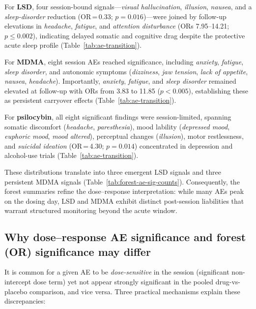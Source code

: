 For \textbf{LSD}, four session-bound signals---\textit{visual hallucination}, \textit{illusion}, \textit{nausea}, and a \textit{sleep-disorder} reduction (OR\,=\,0.33; $p=0.016$)---were joined by follow-up elevations in \textit{headache}, \textit{fatigue}, and \textit{attention disturbance} (ORs 7.95--14.21; $p\leq0.002$), indicating delayed somatic and cognitive drag despite the protective acute sleep profile (Table~\ref{tab:ae-transition}).

For \textbf{MDMA}, eight session AEs reached significance, including \textit{anxiety}, \textit{fatigue}, \textit{sleep disorder}, and autonomic symptoms (\textit{dizziness}, \textit{jaw tension}, \textit{lack of appetite}, \textit{nausea}, \textit{headache}).
Importantly, \textit{anxiety}, \textit{fatigue}, and \textit{sleep disorder} remained elevated at follow-up with ORs from 3.83 to 11.85 ($p<0.005$), establishing these as persistent carryover effects (Table~\ref{tab:ae-transition}).

For \textbf{psilocybin}, all eight significant findings were session-limited, spanning somatic discomfort (\textit{headache}, \textit{paresthesia}), mood lability (\textit{depressed mood}, \textit{euphoric mood}, \textit{mood altered}), perceptual changes (\textit{illusion}), motor restlessness, and \textit{suicidal ideation} (OR\,=\,4.30; $p=0.014$) concentrated in depression and alcohol-use trials (Table~\ref{tab:ae-transition}).

These distributions translate into three emergent LSD signals and three persistent MDMA signals (Table~\ref{tab:forest-ae-sig-counts}).
Consequently, the forest summaries refine the dose–response interpretation: while many AEs peak on the dosing day, LSD and MDMA exhibit distinct post-session liabilities that warrant structured monitoring beyond the acute window.




\subsection{Why dose–response AE significance and forest (OR) significance may differ}

It is common for a given AE to be \emph{dose-sensitive} in the session (significant non-intercept dose term) yet not appear strongly significant in the pooled drug-vs-placebo comparison, and vice versa. Three practical mechanisms explain these discrepancies:

